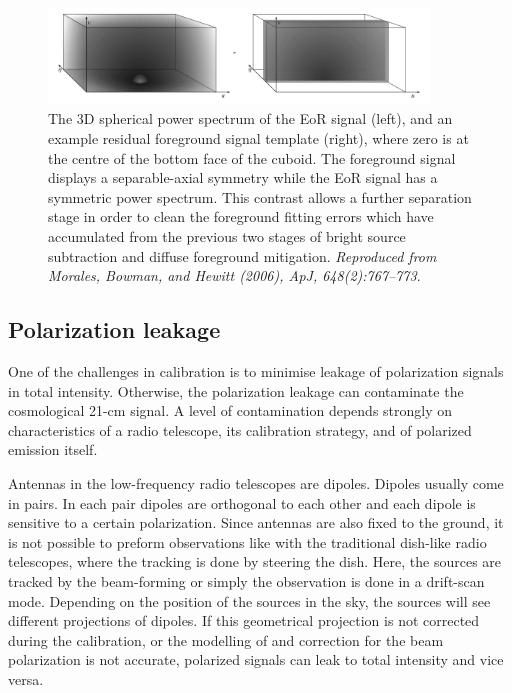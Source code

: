 \begin{figure}
\begin{center}
    \includegraphics[width=0.9\textwidth]{Chapman_Jelic/Images/res_sub.png}
\end{center}
    \caption{The 3D spherical power spectrum of the EoR signal (left), and an example residual foreground signal template (right), where zero is at the centre of the bottom face of the cuboid. The foreground signal displays a separable-axial symmetry while the EoR signal has a symmetric power spectrum. This contrast allows a further separation stage in order to clean the foreground fitting errors which have accumulated from the previous two stages of bright source subtraction and diffuse foreground mitigation. \textit{Reproduced from Morales, Bowman, and Hewitt (2006), ApJ, 648(2):767--773}.}
    \label{fig:ressub}
\end{figure}

\subsection{Polarization leakage}\label{sec:leakage}
One of the challenges in calibration is to minimise leakage of polarization signals in total intensity. Otherwise, the polarization leakage can contaminate the cosmological 21-cm signal. 
A level of contamination depends strongly on characteristics of a radio telescope, its calibration strategy, and of polarized emission itself.

Antennas in the low-frequency radio telescopes are dipoles. Dipoles usually come in pairs. In each pair dipoles are orthogonal to each other and each dipole is sensitive to a certain polarization. Since antennas are also fixed to the ground, it is not possible to preform observations like with the traditional dish-like radio telescopes, where the tracking  is done by steering the dish. Here, the sources are tracked by the beam-forming or simply the observation is done in a drift-scan mode. Depending on the position of the sources in the sky, the sources will see different projections of dipoles. If this geometrical projection  is not corrected during the calibration, or the modelling of and correction for the beam polarization is not accurate, polarized signals can leak to total intensity and vice versa. 

